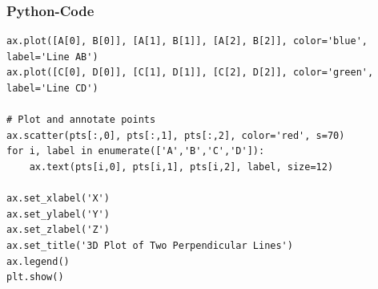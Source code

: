 \documentclass{beamer}
\begin{document}
\begin{frame}[fragile]
\frametitle{Python-Code}
\begin{lstlisting}
ax.plot([A[0], B[0]], [A[1], B[1]], [A[2], B[2]], color='blue', label='Line AB')
ax.plot([C[0], D[0]], [C[1], D[1]], [C[2], D[2]], color='green', label='Line CD')

# Plot and annotate points
ax.scatter(pts[:,0], pts[:,1], pts[:,2], color='red', s=70)
for i, label in enumerate(['A','B','C','D']):
    ax.text(pts[i,0], pts[i,1], pts[i,2], label, size=12)

ax.set_xlabel('X')
ax.set_ylabel('Y')
ax.set_zlabel('Z')
ax.set_title('3D Plot of Two Perpendicular Lines')
ax.legend()
plt.show()

\end{lstlisting}
\end{frame}
\end{document}
